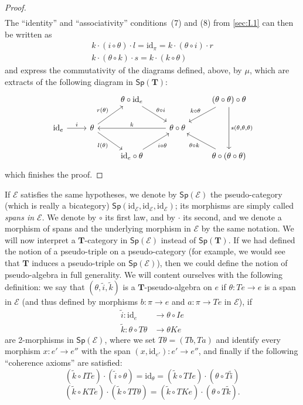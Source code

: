 \documentclass[fleqn]{article}
\newcommand{\oldpage}[1]{\marginpar{\footnotesize$\Big\vert$ \textit{p.~#1}}}
\newcommand{\id}{\mathrm{id}}
\newcommand{\TT}{\mathbf{T}}
\newcommand{\cat}[1]{\mathcal{#1}}
\newcommand{\Cat}[1]{\mathsf{#1}}
\newcommand{\Sp}[1]{\Cat{Sp}(#1)}
\begin{document}
\begin{proof}
\[\begin{aligned}
    \end{aligned}
  \]
  The ``identity'' and ``associativity'' conditions~(7) and (8) from \cref{sec:I.1} can then be written as
  \[
    \begin{gathered}
      k\cdot(i\circ\theta)\cdot l
      = \id_\pi
      = k\cdot(\theta\circ i)\cdot r
    \\k\cdot(\theta\circ k)\cdot s
      = k\cdot(k\circ\theta)
    \end{gathered}
  \]
  and express the commutativity of the diagrams defined, above, by $\mu$, which are extracts of the following diagram in $\Sp{\TT}$:
  \[
    \begin{tikzcd}
      &&\theta\circ\id_e
        \ar[dr,"\theta\circ i"]
      &&(\theta\circ\theta)\circ\theta
        \ar[dl,swap,"k\circ\theta"]
        \ar[dd,"{s(\theta,\theta,\theta)}"]
    \\\id_e
        \ar[r,"i"]
      & \theta
        \ar[ur,"r(\theta)"]
        \ar[dr,swap,"l(\theta)"]
      && \theta\circ\theta
        \ar[ll,swap,"k"]
    \\&&\id_e\circ\theta
        \ar[ur,swap,"i\circ\theta"]
      &&\theta\circ(\theta\circ\theta)
        \ar[ul,"\theta\circ k"]
    \end{tikzcd}
  \]
  \oldpage{260}
  which finishes the proof.
\end{proof}

If $\cat{E}$ satisfies the same hypotheses, we denote by $\Sp{\cat{E}}$ the pseudo-category (which is really a bicategory) $\Sp{\id_\cat{E},\id_\cat{E},\id_\cat{E}}$;
its morphisms are simply called \emph{spans in $\cat{E}$}.
We denote by $\circ$ its first law, and by $\cdot$ its second, and we denote a morphism of spans and the underlying morphism in $\cat{E}$ by the same notation.
We will now interpret a $\TT$-category in $\Sp{\cat{E}}$ instead of $\Sp{\TT}$.
If we had defined the notion of a pseudo-triple on a pseudo-category (for example, we would see that $\TT$ induces a pseudo-triple on $\Sp{\cat{E}}$), then we could define the notion of pseudo-algebra in full generality.
We will content ourselves with the following definition: we say that $(\theta,\tilde{i},\tilde{k})$ is a $\TT$-pseudo-algebra on $e$ if $\theta\colon Te\to e$ is a span in $\cat{E}$ (and thus defined by morphisms $b\colon\pi\to e$ and $a\colon\pi\to Te$ in $\cat{E}$), if
\[
  \begin{aligned}
    \tilde{i}\colon \id_e
    &\to \theta\circ Ie
  \\\tilde{k}\colon \theta\circ T\theta
    &\to \theta Ke
  \end{aligned}
\]
are 2-morphisms in $\Sp{\cat{E}}$, where we set $T\theta=(Tb,Ta)$ and identify every morphism $x\colon e'\to e''$ with the span $(x,\id_{e'})\colon e'\to e''$, and finally if the following ``coherence axioms'' are satisfied:
\[
  (\tilde{k}\circ ITe)\cdot(\tilde{i}\circ\theta)
  = \id_\theta
  = (\tilde{k}\circ TIe)\cdot(\theta\circ T\tilde{i})
  \tag{1}
\]
\[
  (\tilde{k}\circ KTe)\cdot(\tilde{k}\circ TT\theta)
  = (\tilde{k}\circ TKe)\cdot(\theta\circ T\tilde{k}).
  \tag{2}
\]
\end{document}
